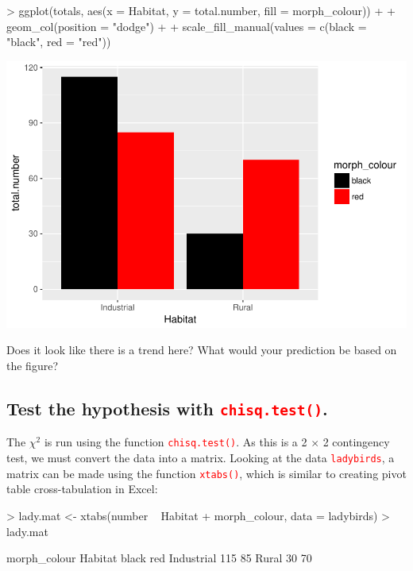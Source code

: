 \documentclass[a4paper,12pt]{article}
\newcommand\code[1]{\textcolor{red}{\texttt{#1}}}
\begin{document}
\begin{shaded}
\begin{Schunk}
\begin{Sinput}
> ggplot(totals, aes(x = Habitat, y = total.number, fill = morph_colour)) +
+   geom_col(position = "dodge") +
+   scale_fill_manual(values = c(black = "black", red = "red"))
\end{Sinput}
\end{Schunk}
\includegraphics{1_Stats_Course_Notes-knitr-008}
\end{shaded}

Does it look like there is a trend here? What would your prediction be based on the figure?

\subsection{Test the hypothesis with \code{chisq.test()}.}

The $\chi^{2}$ is run using the function \code{chisq.test()}. As this is a 2 $\times$ 2 contingency test, we must convert the data into a matrix. Looking at the data \code{ladybirds}, a matrix can be made using the function \code{xtabs()}, which is similar to creating pivot table cross-tabulation in Excel:

\begin{shaded}
\begin{Schunk}
\begin{Sinput}
> lady.mat <- xtabs(number ~ Habitat + morph_colour, data = ladybirds)
> lady.mat
\end{Sinput}
\begin{Soutput}
            morph_colour
Habitat      black red
  Industrial   115  85
  Rural         30  70
\end{Soutput}
\end{Schunk}
\end{shaded}
\end{document}

